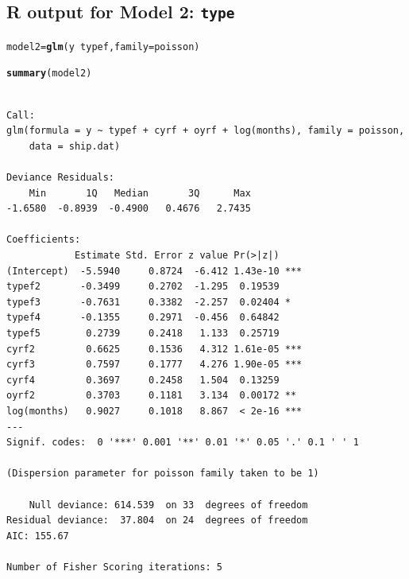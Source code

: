 \documentclass{article}\usepackage[]{graphicx}\usepackage[svgnames]{xcolor}
\makeatletter
\newcommand{\hlopt}[1]{\textcolor[rgb]{0,0,0}{#1}}%
\newcommand{\hlstd}[1]{\textcolor[rgb]{0.345,0.345,0.345}{#1}}%
\newcommand{\hlkwb}[1]{\textcolor[rgb]{0.69,0.353,0.396}{#1}}%
\newcommand{\hlkwc}[1]{\textcolor[rgb]{0.333,0.667,0.333}{#1}}%
\newcommand{\hlkwd}[1]{\textcolor[rgb]{0.737,0.353,0.396}{\textbf{#1}}}%
\newenvironment{kframe}{%
 \def\at@end@of@kframe{}%
 \ifinner\ifhmode%
  \def\at@end@of@kframe{\end{minipage}}%
  \begin{minipage}{\columnwidth}%
 \fi\fi%
 \def\FrameCommand##1{\hskip\@totalleftmargin \hskip-\fboxsep
 \colorbox{shadecolor}{##1}\hskip-\fboxsep
     \hskip-\linewidth \hskip-\@totalleftmargin \hskip\columnwidth}%
 \MakeFramed {\advance\hsize-\width
   \@totalleftmargin\z@ \linewidth\hsize
   \@setminipage}}%
 {\par\unskip\endMakeFramed%
 \at@end@of@kframe}
\newenvironment{knitrout}{}{} %
\makeatother
\begin{document}
\subsection*{R output for Model 2: \texttt{type}}
\begin{knitrout}
\color{fgcolor}\begin{kframe}
\begin{alltt}
\hlstd{model2} \hlkwb{=} \hlkwd{glm}\hlstd{(y} \hlopt{~} \hlstd{typef,} \hlkwc{family} \hlstd{= poisson)}
\end{alltt}


{\ttfamily\noindent\bfseries{}}\begin{alltt}
\hlkwd{summary}\hlstd{(model2)}
\end{alltt}
\begin{verbatim}

Call:
glm(formula = y ~ typef + cyrf + oyrf + log(months), family = poisson, 
    data = ship.dat)

Deviance Residuals: 
    Min       1Q   Median       3Q      Max  
-1.6580  -0.8939  -0.4900   0.4676   2.7435  

Coefficients:
            Estimate Std. Error z value Pr(>|z|)    
(Intercept)  -5.5940     0.8724  -6.412 1.43e-10 ***
typef2       -0.3499     0.2702  -1.295  0.19539    
typef3       -0.7631     0.3382  -2.257  0.02404 *  
typef4       -0.1355     0.2971  -0.456  0.64842    
typef5        0.2739     0.2418   1.133  0.25719    
cyrf2         0.6625     0.1536   4.312 1.61e-05 ***
cyrf3         0.7597     0.1777   4.276 1.90e-05 ***
cyrf4         0.3697     0.2458   1.504  0.13259    
oyrf2         0.3703     0.1181   3.134  0.00172 ** 
log(months)   0.9027     0.1018   8.867  < 2e-16 ***
---
Signif. codes:  0 '***' 0.001 '**' 0.01 '*' 0.05 '.' 0.1 ' ' 1

(Dispersion parameter for poisson family taken to be 1)

    Null deviance: 614.539  on 33  degrees of freedom
Residual deviance:  37.804  on 24  degrees of freedom
AIC: 155.67

Number of Fisher Scoring iterations: 5
\end{verbatim}
\end{kframe}
\end{knitrout}
\end{document}
